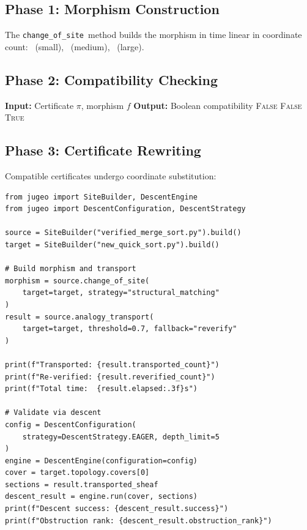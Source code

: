 \documentclass[11pt]{article}
\newcommand{\ChangeOfSite}{\texttt{change\_of\_site}}
\newcommand{\ProofCert}{\pi}
\newcommand{\CompMap}{\gamma}
\begin{document}
\subsection{Phase 1: Morphism Construction}
The \ChangeOfSite\ method builds the morphism in time linear in
coordinate count: \subAnalogytransportSmallTime\ (small),
\subAnalogytransportMediumTime\ (medium),
\subAnalogytransportLargeTime\ (large).

\subsection{Phase 2: Compatibility Checking}

\begin{algorithm}[H]
\caption{Certificate Compatibility Check}
\label{alg:compat-check}
\begin{algorithmic}[1]
\STATE \textbf{Input:} Certificate $\ProofCert$, morphism $f$
\STATE \textbf{Output:} Boolean compatibility
\FOR{each proposition $p$ in $\ProofCert$}
    \IF{$\coord \notin \mathrm{dom}(\CompMap)$}
      \RETURN \textsc{False}
    \ENDIF
  \ENDFOR
    \RETURN \textsc{False}
  \ENDIF
\ENDFOR
\RETURN \textsc{True}
\end{algorithmic}
\end{algorithm}

\subsection{Phase 3: Certificate Rewriting}
Compatible certificates undergo coordinate substitution:

\begin{lstlisting}[style=jugeo-python]
from jugeo import SiteBuilder, DescentEngine
from jugeo import DescentConfiguration, DescentStrategy

source = SiteBuilder("verified_merge_sort.py").build()
target = SiteBuilder("new_quick_sort.py").build()

# Build morphism and transport
morphism = source.change_of_site(
    target=target, strategy="structural_matching"
)
result = source.analogy_transport(
    target=target, threshold=0.7, fallback="reverify"
)

print(f"Transported: {result.transported_count}")
print(f"Re-verified: {result.reverified_count}")
print(f"Total time:  {result.elapsed:.3f}s")

# Validate via descent
config = DescentConfiguration(
    strategy=DescentStrategy.EAGER, depth_limit=5
)
engine = DescentEngine(configuration=config)
cover = target.topology.covers[0]
sections = result.transported_sheaf
descent_result = engine.run(cover, sections)
print(f"Descent success: {descent_result.success}")
print(f"Obstruction rank: {descent_result.obstruction_rank}")
\end{lstlisting}
\end{document}
